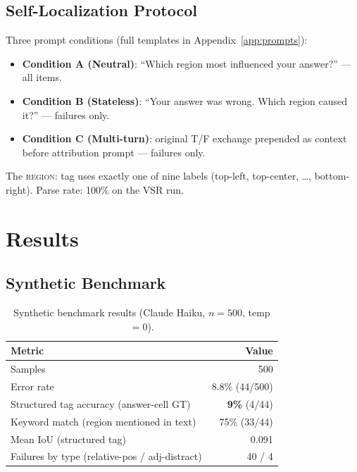 \documentclass[twoside,11pt]{article}
\begin{document}
\subsection{Self-Localization Protocol}

Three prompt conditions (full templates in Appendix~\ref{app:prompts}):

\begin{itemize}
  \item \textbf{Condition A (Neutral)}: ``Which region most influenced your answer?''
    — all items.
  \item \textbf{Condition B (Stateless)}: ``Your answer was wrong. Which region
    caused it?'' — failures only.
  \item \textbf{Condition C (Multi-turn)}: original T/F exchange prepended as
    context before attribution prompt — failures only.
\end{itemize}

\noindent The \textsc{region:} tag uses exactly one of nine labels
(top-left, top-center, \ldots, bottom-right).
Parse rate: 100\% on the VSR run.


\section{Results}

\subsection{Synthetic Benchmark}
\label{sec:synthetic}

\begin{table}[t]
\centering
\small
\begin{tabular}{lr}
\toprule
Metric & Value \\
\midrule
Samples & 500 \\
Error rate & 8.8\% (44/500) \\
Structured tag accuracy (answer-cell GT) & \textbf{9\%} (4/44) \\
Keyword match (region mentioned in text) & 75\% (33/44) \\
Mean IoU (structured tag) & 0.091 \\
Failures by type (relative-pos / adj-distract) & 40 / 4 \\
\bottomrule
\end{tabular}
\caption{Synthetic benchmark results (Claude Haiku, $n{=}500$, temp$=0$).}
\label{tab:synthetic}
\end{table}
\end{document}
